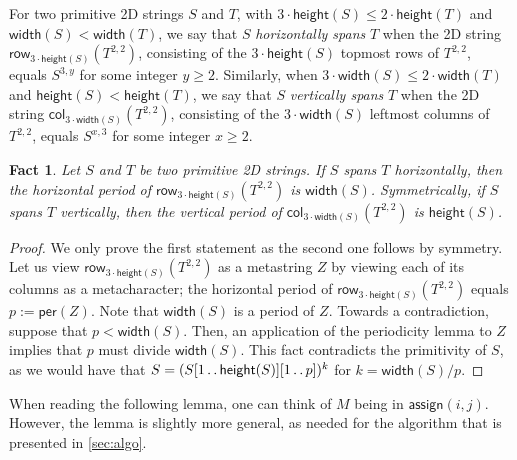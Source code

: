 \documentclass[11pt,letterpaper]{article}
\newcommand{\width}{\textsf{width}}
\newcommand{\height}{\textsf{height}}
\def\dd{\mathinner{.\,.}}
\newcommand{\assign}{\textsf{assign}}
\newcommand{\hspan}[2]{\textsf{row}_{3\cdot \height(#1)}(#2^{2,2})}
\newcommand{\vspan}[2]{\textsf{col}_{3\cdot \width(#1)}(#2^{2,2})}
\newcommand{\per}{\textsf{per}}
\newtheorem{fact}[theorem]{Fact}
\begin{document}
For two primitive 2D strings $S$ and $T$,
with $3\cdot \height(S)\leq 2\cdot \height(T)$ and $\width(S)< \width(T)$,
we say that
$S$ \emph{horizontally spans} $T$ when the 2D string $\hspan{S}{T}$, consisting of the $3\cdot \height(S)$ topmost rows of $T^{2,2}$, equals $S^{3,y}$ for some integer $y \geq 2$.
Similarly, when $3\cdot \width(S)\leq 2\cdot \width(T)$ and $\height(S)< \height(T)$, we say that $S$ \emph{vertically spans} $T$ when the 2D string $\vspan{S}{T}$, consisting of the $3\cdot \width(S)$ leftmost columns of $T^{2,2}$, equals $S^{x,3}$ for some integer $x \geq 2$.

\begin{fact}\label{fact:span}
Let $S$ and $T$ be two primitive 2D strings.
If $S$ spans $T$ horizontally, then the horizontal period of $\hspan{S}{T}$ is $\width(S)$.
Symmetrically, if $S$ spans $T$ vertically, then the vertical period of $\vspan{S}{T}$ is $\height(S)$.
\end{fact}
\begin{proof}
We only prove the first statement as the second one follows by symmetry.
Let us view $\hspan{S}{T}$ as a metastring $Z$ by viewing each of its columns as a metacharacter; the horizontal period of $\hspan{S}{T}$ equals $p:=\per(Z)$.
Note that $\width(S)$ is a period of $Z$.
Towards a contradiction, suppose that $p<\width(S)$.
Then, an application of the periodicity lemma to $Z$ implies that $p$ must divide $\width(S)$.
This fact contradicts the primitivity of $S$, as we would have that $S=(S[1 \dd \height(S)][1 \dd p])^k$ for $k=\width(S)/p$.
\end{proof}

When reading the following lemma, one can think of $M$ being in $\assign(i,j)$.
However, the lemma is slightly more general, as needed for the algorithm that is presented in \cref{sec:algo}.
\end{document}
